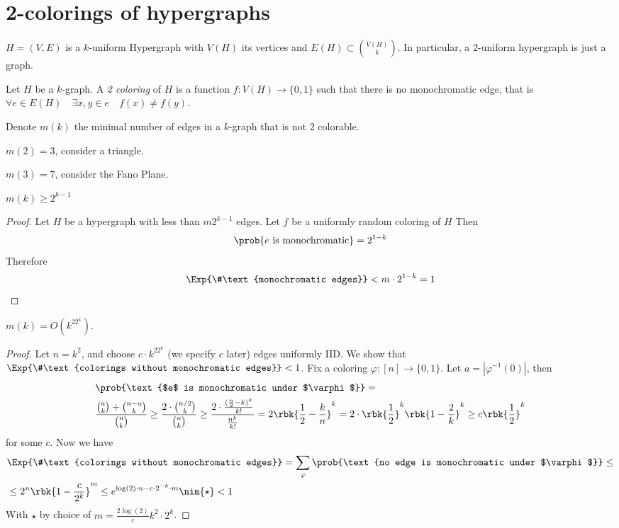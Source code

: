 \documentclass[a4paper, 11pt, oneside]{book}
\begin{document}
\section{2-colorings of hypergraphs}
\begin{yellowBox}
\begin{defn}
	 $H = (V,E)$  is a $k$-uniform Hypergraph with $V(H)$ its vertices and $E(H) \subset {V(H)\choose k}$. In particular, a $2$-uniform hypergraph is just a graph.
\end{defn}	
\begin{defn}
	 Let $H$ be a $k$-graph. A \emph{2 coloring} of $H$ is a function $f:V(H)\to \{0,1\}$ such that there is no monochromatic edge, that is $\forall e\in E(H) \quad \exists x,y\in e \quad f(x)\neq f(y)$. 
\end{defn}
\begin{defn}
	Denote $m(k)$ the minimal number of edges in a $k$-graph that is not $2$ colorable.
\end{defn}
\end{yellowBox}
\begin{example}
	$m(2) = 3$, consider a triangle.
\end{example}
\begin{example}
	$m(3) = 7$, consider the Fano Plane.
\end{example}
\begin{thm}
\label{thm: bound on minimal edges in no 2 color hyper}
	$m(k)\ge 2^{k-1}$
\end{thm}
\begin{proof}
	Let $H$ be a hypergraph with less than $m2^{k-1}$ edges. Let $f$ be a uniformly random coloring of $H$ Then
	\[
	\prob{e\text{ is monochromatic}} = 2^{1-k}
	\]Therefore
	\[
	\Exp{\#\text{monochromatic edges}} < m\cdot2^{1-k} = 1
	\]
\end{proof}
\begin{thm}
$m(k) = O(k^22^k)$.	
\end{thm}
\begin{proof}
	Let $n = k^2$, and choose $c\cdot k^22^k$ (we specify $c$ later) edges uniformly IID. We show that $\Exp{\#\text{colorings without monochromatic edges}} < 1$. Fix a coloring $\varphi:[n]\to \{0,1\}$. Let $a = |\varphi^{-1}(0)|$, then
	\begin{align*}
	&\prob{\text{$e$ is monochromatic under $\varphi$}} =\\ &\frac{{a\choose k} + {n-a \choose k}}{{n\choose k}} \ge \frac{2\cdot{n/2\choose k}}{{n\choose k}} \ge \frac{2\cdot \frac{(\frac{n}{2} - k)^k}{k!} }{\frac{n^k}{k!}} = 2\rbk{\frac{1}{2}-\frac{k}{n}}^k = 2\cdot\rbk{\frac{1}{2}}^k\rbk{1-\frac{2}{k}}^k \ge c\rbk{\frac{1}{2}}^k
	\end{align*}
	for some $c$. Now we have
	\begin{align*}
		&\Exp{\#\text{colorings without monochromatic edges}} = \sum_{\varphi}\prob{\text{no edge is monochromatic under $\varphi$}} \le \\
		& \le 2^n\rbk{1-\frac{c}{2^k}}^m \le e^{\log(2)\cdot n - c\cdot 2^{-k}\cdot m} \nim{\star}< 1
	\end{align*}
	With $\star$ by choice of $m = \frac{2\log(2)}{c}k^2\cdot 2^k$.
\end{proof}
\end{document}
